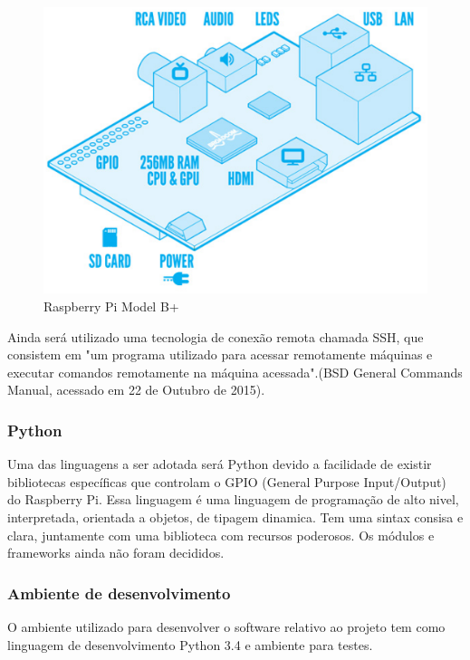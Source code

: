 \begin{figure}[!htb]
	\centering
	\includegraphics[keepaspectratio=true,scale=0.5]{figuras/referencialteorico/raspberry.eps}
	\caption{Raspberry Pi Model B+}
	\label{rasp}
\end{figure}

Ainda será utilizado uma tecnologia de conexão remota chamada SSH, que consistem em "um programa utilizado para acessar remotamente máquinas e executar comandos remotamente na máquina acessada".(BSD General Commands Manual, acessado em 22 de Outubro de 2015).

\subsubsection{Python}

Uma das linguagens a ser adotada será Python devido a facilidade de existir bibliotecas específicas que controlam o GPIO (General Purpose Input/Output) do Raspberry Pi. Essa linguagem é uma linguagem de programação de alto nivel, interpretada, orientada a objetos, de tipagem dinamica. Tem uma sintax consisa e clara, juntamente com uma biblioteca com recursos poderosos. Os módulos e frameworks ainda não foram decididos.

\subsubsection{Ambiente de desenvolvimento}

O ambiente utilizado para desenvolver o software relativo ao projeto tem como linguagem de desenvolvimento Python 3.4 e ambiente para testes.

